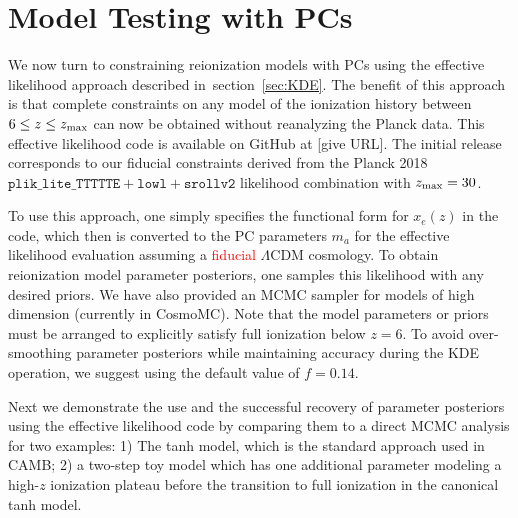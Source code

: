 \documentclass[prd,twocolumn,amsmath,amssymb,floatfix,superscriptaddress,nofootinbib]{revtex4-1}
\newcommand{\refsec}[1]{section~\ref{sec:#1}}
\newcommand{\zmax}{z_{\rm max}}
\newcommand{\wh}[1]{\textcolor{blue}{#1}}
\newcommand{\ch}[1]{\textcolor{red}{#1}}
\begin{document}

\section{Model Testing with PCs}
\label{sec:effective_likelihood}

We now turn to constraining reionization models with PCs using the
effective likelihood approach described in~\refsec{KDE}.  The benefit of this approach is that
complete constraints on any model of the ionization history  between $6 \leq z \leq \zmax$ can now be obtained without reanalyzing the Planck data. 
This effective likelihood code is available on GitHub at \url{} [give URL]. The initial release corresponds to our fiducial constraints derived from the Planck 2018 $\texttt{plik\_lite\_TTTTTE} + \texttt{lowl} + \texttt{srollv2}$ likelihood combination with $\zmax = 30$. 

To use this approach, one simply specifies the functional form for $x_e(z)$ in the code, which then is converted to the PC parameters $m_a$ for the effective likelihood evaluation assuming a \ch{fiducial} $\Lambda$CDM cosmology.   
To obtain reionization model parameter posteriors, one samples this likelihood with any desired priors.   
We have also provided an MCMC sampler for models of high dimension (currently in CosmoMC). Note that the model parameters or priors must be arranged to explicitly satisfy 
full ionization below $z=6$. To avoid over-smoothing parameter posteriors while maintaining accuracy during the KDE operation, we suggest using the default value of $f = 0.14$.

Next we demonstrate the use and the successful recovery of parameter posteriors using the effective likelihood code by comparing them to a direct MCMC analysis for two examples: 1) The tanh model, which is the standard approach used in CAMB; 2) a two-step toy model which has one additional parameter modeling a high-$z$ ionization plateau before the transition to full ionization in the canonical tanh model.
\end{document}
